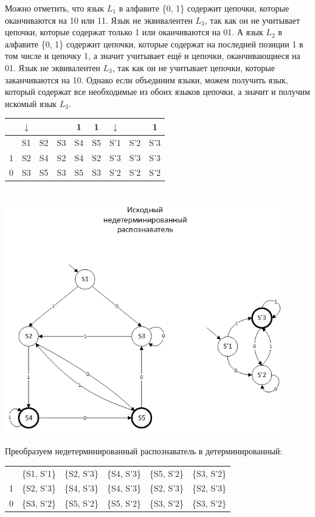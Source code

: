 \documentclass[a4paper,14pt]{extarticle}
\begin{document}
\begin{enumerate}[1.]
Можно отметить, что язык $L_1$ в алфавите \{0, 1\} содержит цепочки, которые оканчиваются на 10 или 11.
Язык не эквивалентен $L_3$, так как он не учитывает цепочки, которые содержат только 1 или оканчиваются на 01.  
А язык $L_2$ в алфавите \{0, 1\} содержит цепочки, которые содержат на последней позиции 1 в том числе и 
цепочку 1, а значит учитывает ещё и цепочки, оканчивающиеся на 01. 
Язык не эквивалентен $L_3$, так как он не учитывает цепочки, которые заканчиваются на 10.
Однако если объединим языки, можем получить язык, который содержат все необходимые из обоих языков цепочки, 
а значит и получим искомый язык $L_3$.\\


\begin{tabular}{|c|c|c|c|c|c|c|c|c|}
    \hline
& $\downarrow$ &  &  & 1 & 1 & $\downarrow$ & & 1\\
\hline
& S1 & S2 & S3 & S4 & S5 & S'1 & S'2 & S'3\\
\hline
1 & S2 & S4 & S2 & S4 & S2 & S'3 & S'3 & S'3 \\
\hline
0 & S3 & S5 & S3 & S5 & S3 & S'2 & S'2 & S'2 \\
\hline
\end{tabular}\\
\includegraphics[width=120mm]{task3_new_non_determined}

Преобразуем недетерминированный распознаватель в детерминированный:\\

\begin{tabular}{|c|c|c|c|c|c|}
    \hline
& &  & &&\\
\hline
  & \{S1, S'1\} & \{S2, S'3\} & \{S4, S'3\} & \{S5, S'2\} & \{S3, S'2\}\\
\hline
1 & \{S2, S'3\} & \{S4, S'3\} & \{S4, S'3\} & \{S2, S'3\} & \{S2, S'3\}\\
\hline
0 & \{S3, S'2\} & \{S5, S'2\} & \{S5, S'2\} & \{S3, S'2\} & \{S3, S'2\}\\
\hline
\end{tabular}\\


\end{enumerate}
\end{document}
